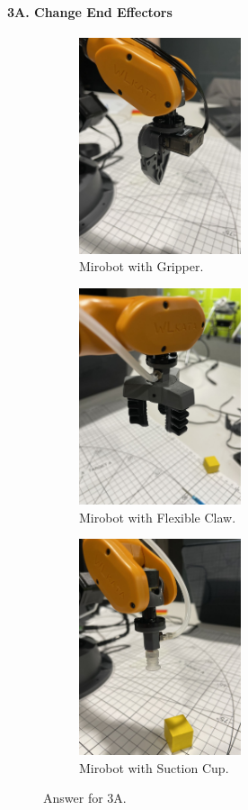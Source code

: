 
\paragraph{3A. Change End Effectors}
%
\begin{figure}[h!]
    \centering
    \begin{subfigure}[b]{0.3\textwidth}
        \includegraphics[height=2.5in]{image/3a_gripper.jpg}
         \caption*{Mirobot with Gripper.}
     \end{subfigure}
     \hfill
     \begin{subfigure}[b]{0.3\textwidth}
        \includegraphics[height=2.5in]{image/3a_soft.jpg}
         \caption*{Mirobot with Flexible Claw.}
     \end{subfigure}
     \hfill
     \begin{subfigure}[b]{0.3\textwidth}
        \includegraphics[height=2.5in]{image/3a_suction_cup.jpg}
         \caption*{Mirobot with Suction Cup.}
     \end{subfigure}     
    \caption*{Answer for 3A.}
\end{figure}
